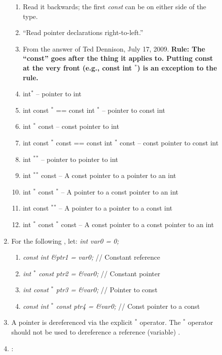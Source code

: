 \begin{enumerate}
\begin{enumerate}
\begin{enumerate}
\begin{enumerate}
			\item Read it backwards; the first {\it const} can be on either side of the type.
			\item ``Read pointer declarations right-to-left.''
			\item From the answer of Ted Dennison, July 17, 2009. {\bf Rule: The ``const'' goes after the thing it applies to. Putting const at the very front (e.g., const int $^{\ast}$) is an exception to the rule.}
			\item int$^{\ast}$ -- pointer to int
			\item int const $^{\ast}$ == const int $^{\ast}$ -- pointer to const int
			\item int $^{\ast}$ const -- const pointer to int
			\item int const $^{\ast}$ const == const int $^{\ast}$ const -- const pointer to const int
			\item int $^{\ast}$$^{\ast}$ -- pointer to pointer to int
			\item int $^{\ast}$$^{\ast}$ const -- A const pointer to a pointer to an int
			\item int $^{\ast}$ const $^{\ast}$ -- A pointer to a const pointer to an int
			\item int const $^{\ast}$$^{\ast}$ -- A pointer to a pointer to a const int
			\item int $^{\ast}$ const $^{\ast}$ const -- A const pointer to a const pointer to an int
			\end{enumerate}
		\item For the following \cite{Mortensen2015}, let: {\it int var0 = 0;} \vspace{-0.1cm}
			\begin{enumerate} \itemsep -1pt
			\item {\it const int {\rm \&}ptr1 = var0;} // Constant reference
			\item {\it int $^{\ast}$ const ptr2 = {\rm \&}var0;} // Constant pointer
			\item {\it int const $^{\ast}$ ptr3 = {\rm \&}var0;} // Pointer to const
			\item {\it const int $^{\ast}$ const ptr4 = {\rm \&}var0;} // Const pointer to a const
			\end{enumerate}
		\item A pointer is dereferenced via the explicit $^{\ast}$ operator. The $^{\ast}$ operator should not be used to dereference a reference (variable) \cite{Saks2001}.
		\item \cite{Saks2001}: \vspace{-0.1cm}

\end{enumerate}
\end{enumerate}
\end{enumerate}
